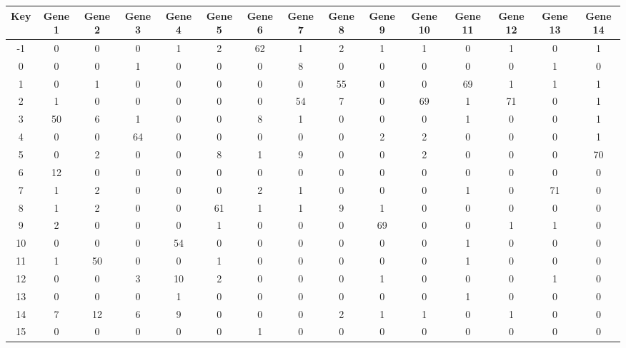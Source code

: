 \begin{tabular}{|c|c|c|c|c|c|c|c|c|c|c|c|c|c|c|}
\hline
Key & Gene 1 & Gene 2 & Gene 3 & Gene 4 & Gene 5 & Gene 6 & Gene 7 & Gene 8 & Gene 9 & Gene 10 & Gene 11 & Gene 12 & Gene 13 & Gene 14 \\
\hline
-1 & 0 & 0 & 0 & 1 & 2 & 62 & 1 & 2 & 1 & 1 & 0 & 1 & 0 & 1 \\
0 & 0 & 0 & 1 & 0 & 0 & 0 & 8 & 0 & 0 & 0 & 0 & 0 & 1 & 0 \\
1 & 0 & 1 & 0 & 0 & 0 & 0 & 0 & 55 & 0 & 0 & 69 & 1 & 1 & 1 \\
2 & 1 & 0 & 0 & 0 & 0 & 0 & 54 & 7 & 0 & 69 & 1 & 71 & 0 & 1 \\
3 & 50 & 6 & 1 & 0 & 0 & 8 & 1 & 0 & 0 & 0 & 1 & 0 & 0 & 1 \\
4 & 0 & 0 & 64 & 0 & 0 & 0 & 0 & 0 & 2 & 2 & 0 & 0 & 0 & 1 \\
5 & 0 & 2 & 0 & 0 & 8 & 1 & 9 & 0 & 0 & 2 & 0 & 0 & 0 & 70 \\
6 & 12 & 0 & 0 & 0 & 0 & 0 & 0 & 0 & 0 & 0 & 0 & 0 & 0 & 0 \\
7 & 1 & 2 & 0 & 0 & 0 & 2 & 1 & 0 & 0 & 0 & 1 & 0 & 71 & 0 \\
8 & 1 & 2 & 0 & 0 & 61 & 1 & 1 & 9 & 1 & 0 & 0 & 0 & 0 & 0 \\
9 & 2 & 0 & 0 & 0 & 1 & 0 & 0 & 0 & 69 & 0 & 0 & 1 & 1 & 0 \\
10 & 0 & 0 & 0 & 54 & 0 & 0 & 0 & 0 & 0 & 0 & 1 & 0 & 0 & 0 \\
11 & 1 & 50 & 0 & 0 & 1 & 0 & 0 & 0 & 0 & 0 & 1 & 0 & 0 & 0 \\
12 & 0 & 0 & 3 & 10 & 2 & 0 & 0 & 0 & 1 & 0 & 0 & 0 & 1 & 0 \\
13 & 0 & 0 & 0 & 1 & 0 & 0 & 0 & 0 & 0 & 0 & 1 & 0 & 0 & 0 \\
14 & 7 & 12 & 6 & 9 & 0 & 0 & 0 & 2 & 1 & 1 & 0 & 1 & 0 & 0 \\
15 & 0 & 0 & 0 & 0 & 0 & 1 & 0 & 0 & 0 & 0 & 0 & 0 & 0 & 0 \\
\hline
\end{tabular}
